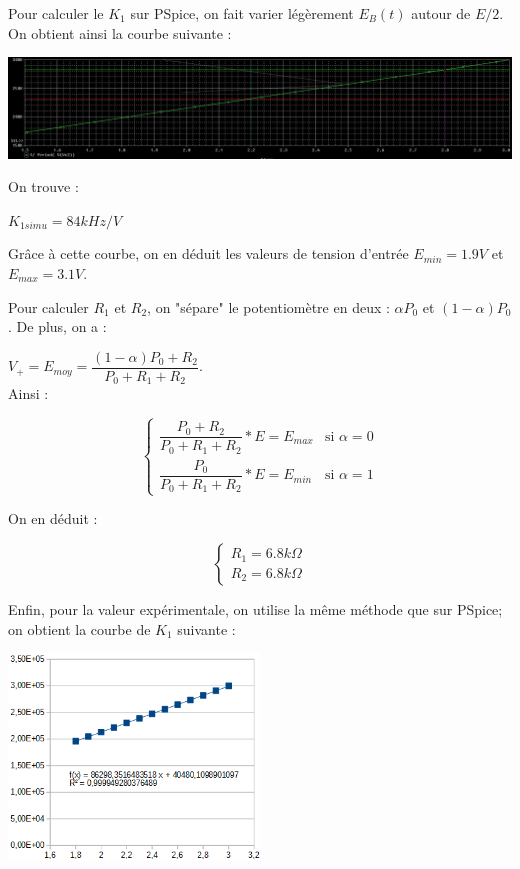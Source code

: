 \documentclass[a4paper]{report}
\begin{document}
Pour calculer le $K_1$ sur PSpice, on fait varier légèrement $E_B (t)$ autour de $E/2$. On obtient ainsi la courbe suivante :

\begin{center}
\includegraphics[width=1\textwidth]{K1_simu.PNG}
\end{center}

On trouve :

\begin{center}
$K_{1simu} = 84 kHz/V$
\end{center}

Grâce à cette courbe, on en déduit les valeurs de tension d'entrée $E_{min} = 1.9V$ et $E_{max} = 3.1V$.

Pour calculer $R_1$ et $R_2$, on "sépare" le potentiomètre en deux : $\alpha P_0$ et $(1-\alpha)P_0$. De plus, on a :

$V_+ = E_{moy} = \dfrac{(1-\alpha)P_0 + R_2}{P_0 + R_1 + R_2}.$
\\

Ainsi :
\begin{center}
$$
\left\{
    \begin{array}{ll}
        \dfrac{P_0 + R_2}{P_0 + R_1 + R_2}*E = E_{max} & \mbox{si } \alpha = 0 \\
        \dfrac{P_0}{P_0 + R_1 + R_2}*E = E_{min} & \mbox{si } \alpha = 1
    \end{array}
\right.
$$
\end{center}

On en déduit : 
\begin{center}
$$
\left\{
    \begin{array}{ll}
        R_1 = 6.8k\Omega \\
        R_2 = 6.8k\Omega
    \end{array}
\right.
$$
\end{center}

Enfin, pour la valeur expérimentale, on utilise la même méthode que sur PSpice; on obtient la courbe de $K_1$ suivante :

\begin{center}
\includegraphics[width=0.5\textwidth]{K1_exp.PNG}
\end{center}
\end{document}

